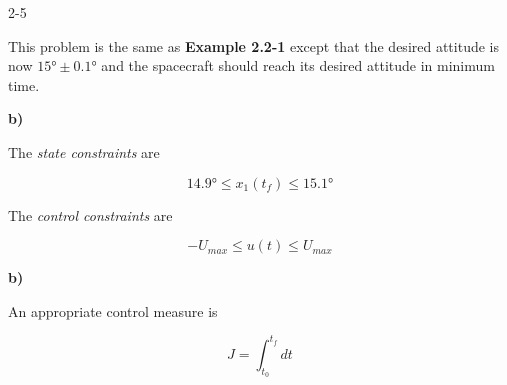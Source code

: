 \begin{problem}{2-5}
\end{problem}

This problem is the same as \textbf{Example 2.2-1} except that the desired
attitude is now $\ang{15} \pm \ang{0.1}$ and the spacecraft should reach its
desired attitude in minimum time.

\noindent \textbf{b)}

The \textit{state constraints} are

\begin{equation}\label{eq:sc_att_15}
    \ang{14.9} \leq x_1(t_f) \leq \ang{15.1} \nonumber
\end{equation}

The \textit{control constraints} are

\begin{equation}\label{eq:sc_att_15} \nonumber
   -U_{max} \leq u(t) \leq U_{max}
\end{equation}

\noindent \textbf{b)}

An appropriate control measure is

\begin{equation}
  J = \int_{t_0}^{t_f} dt \nonumber
\end{equation}
